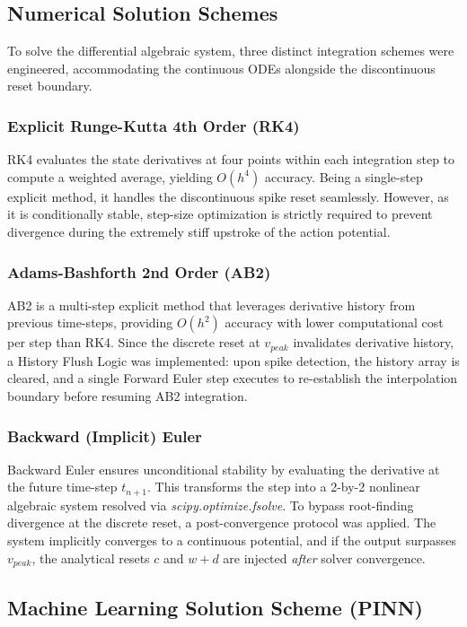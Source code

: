 \documentclass[conference]{IEEEtran}
\begin{document}
\subsection{Numerical Solution Schemes}

To solve the differential algebraic system, three distinct integration schemes were engineered, accommodating the continuous ODEs alongside the discontinuous reset boundary.

\subsubsection{Explicit Runge-Kutta 4th Order (RK4)}
RK4 evaluates the state derivatives at four points within each integration step to compute a weighted average, yielding $O(h^4)$ accuracy. Being a single-step explicit method, it handles the discontinuous spike reset seamlessly. However, as it is conditionally stable, step-size optimization is strictly required to prevent divergence during the extremely stiff upstroke of the action potential.

\subsubsection{Adams-Bashforth 2nd Order (AB2)}
AB2 is a multi-step explicit method that leverages derivative history from previous time-steps, providing $O(h^2)$ accuracy with lower computational cost per step than RK4. Since the discrete reset at $v_{peak}$ invalidates derivative history, a History Flush Logic was implemented: upon spike detection, the history array is cleared, and a single Forward Euler step executes to re-establish the interpolation boundary before resuming AB2 integration.

\subsubsection{Backward (Implicit) Euler}
Backward Euler ensures unconditional stability by evaluating the derivative at the future time-step $t_{n+1}$. This transforms the step into a 2-by-2 nonlinear algebraic system resolved via \textit{scipy.optimize.fsolve}. To bypass root-finding divergence at the discrete reset, a post-convergence protocol was applied. The system implicitly converges to a continuous potential, and if the output surpasses $v_{peak}$, the analytical resets $c$ and $w+d$ are injected \textit{after} solver convergence.

\subsection{Machine Learning Solution Scheme (PINN)}
\end{document}
